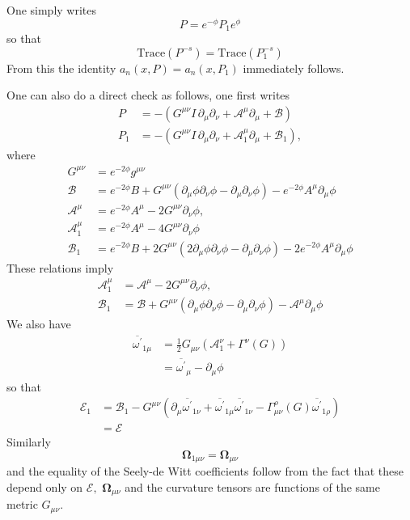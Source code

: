 \documentclass[12pt]{article}%
\begin{document}
One simply writes
\[
P=e^{-\phi}P_{1}e^{\phi}%
\]
so that
\[
\mathrm{Trace}\left(  P^{-s}\right)  =\mathrm{Trace}\left(  P_{1}^{-s}\right)
\]
From this the identity $a_{n}\left(  x,P\right)  =a_{n}\left(  x,P_{1}\right)
$ immediately follows.

One can also do a direct check as follows, one first writes
\begin{align*}
P  &  =-\left(  G^{\mu\nu}I\,\partial_{\mu}\partial_{\nu}+\mathcal{A}^{\mu
}\partial_{\mu}+\mathcal{B}\right) \\
P_{1}  &  =-\left(  G^{\mu\nu}I\,\partial_{\mu}\partial_{\nu}+\mathcal{A}%
_{1}^{\mu}\partial_{\mu}+\mathcal{B}_{1}\right)  ,
\end{align*}
where%
\begin{align*}
G^{\mu\nu}  &  =e^{-2\phi}g^{\mu\nu}\\
\mathcal{B}  &  =e^{-2\phi}B+G^{\mu\nu}\left(  \partial_{\mu}\phi\partial
_{\nu}\phi-\partial_{\mu}\partial_{\nu}\phi\right)  -e^{-2\phi}A^{\mu}%
\partial_{\mu}\phi\\
\mathcal{A}^{\mu}  &  =e^{-2\phi}A^{\mu}-2G^{\mu\nu}\partial_{\nu}\phi,\\
\mathcal{A}_{1}^{\mu}  &  =e^{-2\phi}A^{\mu}-4G^{\mu\nu}\partial_{\nu}\phi\\
\mathcal{B}_{1}  &  =e^{-2\phi}B+2G^{\mu\nu}\left(  2\partial_{\mu}%
\phi\partial_{\nu}\phi-\partial_{\mu}\partial_{\nu}\phi\right)  -2e^{-2\phi
}A^{\mu}\partial_{\mu}\phi
\end{align*}
These relations imply
\begin{align*}
\mathcal{A}_{1}^{\mu}  &  =\mathcal{A}^{\mu}-2G^{\mu\nu}\partial_{\nu}\phi,\\
\mathcal{B}_{1}  &  =\mathcal{B+}G^{\mu\nu}\left(  \partial_{\mu}\phi
\partial_{\nu}\phi-\partial_{\mu}\partial_{\nu}\phi\right)  -\mathcal{A}^{\mu
}\partial_{\mu}\phi
\end{align*}
We also have
\begin{align*}
\overline{\omega^{\prime}}_{1\mu}  &  =\frac{1}{2}G_{\mu\nu}\left(
\mathcal{A}_{1}^{\nu}+\Gamma^{\nu}\left(  G\right)  \right) \\
&  =\overline{\omega^{\prime}}_{\mu}-\partial_{\mu}\phi
\end{align*}
so that
\begin{align*}
\mathcal{E}_{1}  &  =\mathcal{B}_{1}-G^{\mu\nu}\left(  \partial_{\mu}%
\overline{\omega^{\prime}}_{1\nu}+\overline{\omega^{\prime}}_{1\mu}%
\overline{\omega^{\prime}}_{1\nu}-\Gamma_{\mu\nu}^{\rho}\left(  G\right)
\overline{\omega^{\prime}}_{1\rho}\right) \\
&  =\mathcal{E}%
\end{align*}
Similarly
\[
\mathbf{\Omega}_{1\mu\nu}=\mathbf{\Omega}_{\mu\nu}%
\]
and the equality of the Seely-de Witt coefficients follow from the fact that
these depend only on $\mathcal{E},$ $\mathbf{\Omega}_{\mu\nu}$ and the
curvature tensors are functions of the same metric $G_{\mu\nu}.$
\end{document}
